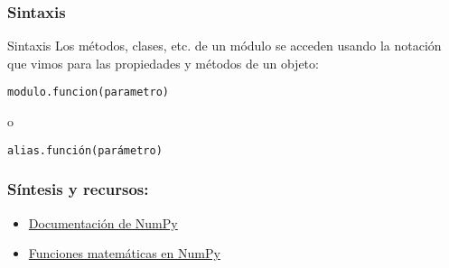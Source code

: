 \documentclass{beamer}
\begin{document}
\begin{frame}[fragile]
\frametitle{Sintaxis}
\begin{block}{Sintaxis}
Los métodos, clases, etc. de un módulo se acceden usando la notación que vimos para las propiedades y métodos de un objeto:
\begin{verbatim}
modulo.funcion(parametro)
\end{verbatim}
o
\begin{verbatim}
alias.función(parámetro)
\end{verbatim}
\end{block}
\end{frame}

\begin{frame}
\frametitle{Síntesis y recursos:}

\begin{itemize}
\item \href{https://numpy.org/doc/stable/}{Documentación de NumPy}
\item \href{https://numpy.org/doc/stable/reference/routines.math.html}{Funciones matemáticas en NumPy}

\end{itemize}
\end{frame}
\end{document}
